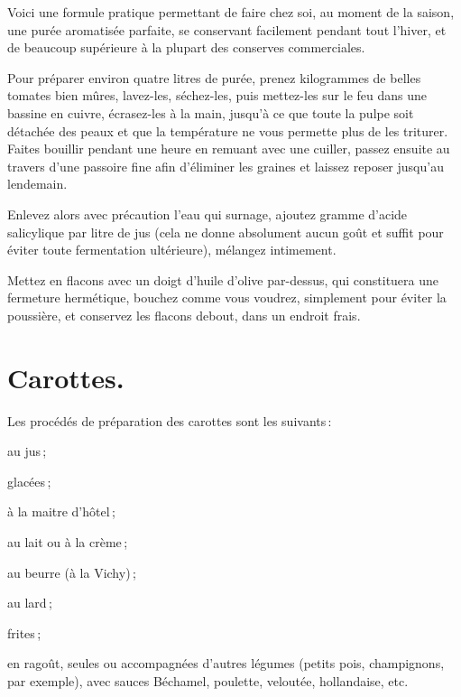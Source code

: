 Voici une formule pratique permettant de faire chez soi, au moment de la
saison, une purée aromatisée parfaite, se conservant facilement pendant tout
l'hiver, et de beaucoup supérieure à la plupart des conserves commerciales.

Pour préparer environ quatre litres de purée, prenez {\mmm} kilogrammes
de belles tomates bien mûres, lavez-les, séchez-les, puis mettez-les sur le feu
dans une bassine en cuivre, écrasez-les à la main, jusqu'à ce que toute la
pulpe soit détachée des peaux et que la température ne vous permette plus de
les triturer. Faites bouillir pendant une heure en remuant avec une cuiller,
passez ensuite au travers d'une passoire fine afin d'éliminer les graines et
laissez reposer jusqu'au lendemain.

Enlevez alors avec précaution l'eau qui surnage, ajoutez {\mmm} gramme
d'acide salicylique par litre de jus (cela ne donne absolument aucun goût et
suffit pour éviter toute fermentation ultérieure), mélangez intimement.

Mettez en flacons avec un doigt d'huile d'olive par-dessus, qui constituera une
fermeture hermétique, bouchez comme vous voudrez, simplement pour éviter la
poussière, et conservez les flacons debout, dans un endroit frais.

\section*{\centering Carottes.}
{}

Les procédés de préparation des carottes sont les suivants :

au jus ;

glacées ;

à la maitre d'hôtel ;

au lait ou à la crème ;

au beurre (à la Vichy) ;

au lard ;

frites ;

en ragoût, seules ou accompagnées d'autres légumes (petits pois, champignons,
par exemple), avec sauces Béchamel, poulette, veloutée, hollandaise, etc.

